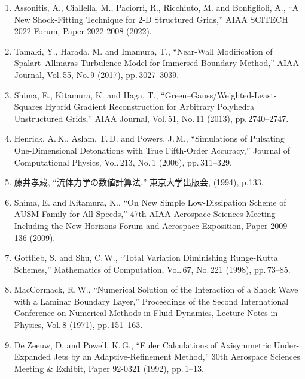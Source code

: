 \documentclass[a4j]{jarticle}
\begin{document}
\begin{enumerate}
  \item Assonitis, A., Ciallella, M., Paciorri, R., Ricchiuto, M. and Bonfiglioli, A., ``A New Shock-Fitting Technique for 2-D Structured Grids,'' 
  AIAA SCITECH 2022 Forum, Paper 2022-2008 (2022).
  \label{ref:SESF}

  \item Tamaki, Y., Harada, M. and Imamura, T., ``Near-Wall Modification of Spalart–Allmaras Turbulence Model for Immersed Boundary Method,'' 
  AIAA Journal, Vol.\,55, No.\,9 (2017), pp.\,3027--3039.
  \label{ref:IBM}

  \item Shima, E., Kitamura, K. and Haga, T., ``Green–Gauss/Weighted-Least-Squares Hybrid Gradient Reconstruction for Arbitrary Polyhedra Unstructured Grids,'' 
  AIAA Journal, Vol.\,51, No.\,11 (2013), pp.\,2740--2747.
  \label{ref:gg}

  \item Henrick, A.\,K., Aslam, T.\,D. and Powers, J.\,M., ``Simulations of Pulsating One-Dimensional Detonations with True Fifth-Order Accuracy,'' 
  Journal of Computational Physics, Vol.\,213, No.\,1 (2006), pp.\,311--329.
  \label{ref:MUSCL}

  \item 藤井孝藏, ``流体力学の数値計算法,'' 東京大学出版会, (1994), p.133.
  \label{ref:fuji}

  \item Shima, E. and Kitamura, K., ``On New Simple Low-Dissipation Scheme of AUSM-Family for All Speeds,'' 
  47th AIAA Aerospace Sciences Meeting Including the New Horizons Forum and Aerospace Exposition, Paper 2009-136 (2009).
  \label{ref:SLAU}

  \item Gottlieb, S. and Shu, C.\,W., ``Total Variation Diminishing Runge-Kutta Schemes,'' 
  Mathematics of Computation, Vol.\,67, No.\,221 (1998), pp.\,73–85.  
  \label{ref:TVDrk3}

  \item MacCormack, R.\,W., ``Numerical Solution of the Interaction of a Shock Wave with a Laminar Boundary Layer,'' 
  Proceedings of the Second International Conference on Numerical Methods in Fluid Dynamics, Lecture Notes in Physics, Vol.\,8 (1971), pp.\,151–163.  
  \label{ref:CFL}

  \item De Zeeuw, D. and Powell, K.\,G., ``Euler Calculations of Axisymmetric Under-Expanded Jets by an Adaptive-Refinement Method,'' 
  30th Aerospace Sciences Meeting \& Exhibit, Paper 92-0321 (1992), pp.\,1--13.
  \label{ref:AMR}


\end{enumerate}
\end{document}
